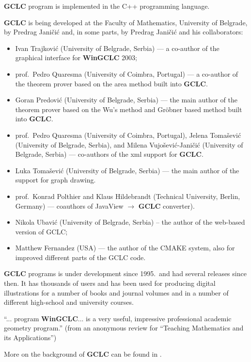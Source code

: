 \documentclass[a4paper]{book}
\newcommand{\gclc}{{\bfseries GCLC}\xspace}
\newcommand{\wingclc}{{\bfseries WinGCLC}\xspace}
\begin{document}
\begin{description}
\gclc program is implemented in the C++ programming language.

\item[Authors:]
\gclc is being developed at the Faculty of Mathematics,
University of Belgrade, by Predrag Jani\v{c}i\'c and, in some
parts, by Predrag Jani\v{c}i\'c and his collaborators:
\begin{itemize}
\item Ivan Trajkovi\'c (University of Belgrade, Serbia)
--- a co-author of the graphical interface for \wingclc 2003;
\item prof.~Pedro Quaresma (University of Coimbra, Portugal) ---
a co-author of the theorem prover based on the area method built into \gclc.

\item Goran Predovi\'c (University of Belgrade, Serbia) --- the main 
author of the theorem prover based on the Wu's method and Gr\"obner 
based method built into \gclc.

\item prof.~Pedro Quaresma (University of Coimbra, Portugal),
Jelena To\-ma\-\v{s}e\-vi\'c (University of Belgrade, Serbia), and
Milena Vujo\v{s}evi\'c-Jani\v{c}i\'c (University of Belgrade, Serbia)
--- co-authors of the {\sc xml} support for \gclc.

\item Luka Toma\v{s}evi\'c (University of Belgrade, Serbia) --- the
main author of the support for graph drawing.

\item prof.~Konrad Polthier and Klaus Hildebrandt (Technical University,
Berlin, Germany) --- coauthors of JavaView $\rightarrow$ \gclc converter).

\item Nikola Ubavi\'c (University of Belgrade, Serbia) --
the author of the web-based version of GCLC;

\item Matthew Fernandez (USA) --- the author of the CMAKE system,
also for improved different parts of the GCLC code.
\end{itemize}

\item[Version history:]
\gclc programs is under development since 1995.~and had several releases 
since then. It has thousands of users and has been used for producing 
digital illustrations for a number of books and journal volumes and in 
a number of different high-school and university courses.

\item[What others said about \gclc/\wingclc:]
``... program \wingclc ... is a very useful, impressive professional
academic geometry program.'' (from an anonymous review for ``Teaching
Mathematics and its Applications'')

\item[References:]
More on the background of \gclc can be found in
\cite{gclc,wingclc, constructions-teamat,gclc-mkm,gclc-ijcar,gclc-jar}.
\end{description}
\end{document}
